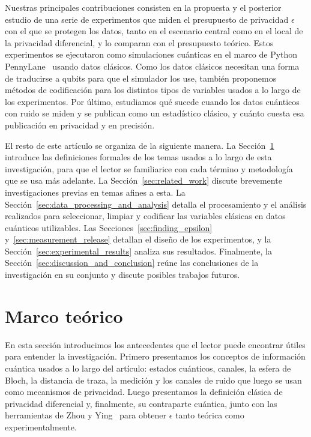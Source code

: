 \documentclass{ieeeaccess}
\begin{document}
Nuestras principales contribuciones consisten en la propuesta y el posterior estudio de una serie de experimentos que miden el presupuesto de privacidad $\epsilon$ con el que se protegen los datos, tanto en el escenario central como en el local de la privacidad diferencial, y lo comparan con el presupuesto teórico. Estos experimentos se ejecutaron como simulaciones cuánticas en el marco de Python PennyLane~\cite{bergholm2018pennylane} usando datos clásicos. Como los datos clásicos necesitan una forma de traducirse a qubits para que el simulador los use, también proponemos métodos de codificación para los distintos tipos de variables usados a lo largo de los experimentos. Por último, estudiamos qué sucede cuando los datos cuánticos con ruido se miden y se publican como un estadístico clásico, y cuánto cuesta esa publicación en privacidad y en precisión.

El resto de este artículo se organiza de la siguiente manera. La Sección~\ref{sec:background} introduce las definiciones formales de los temas usados a lo largo de esta investigación, para que el lector se familiarice con cada término y metodología que se usa más adelante. La Sección~\ref{sec:related_work} discute brevemente investigaciones previas en temas afines a esta. La Sección~\ref{sec:data_processing_and_analysis} detalla el procesamiento y el análisis realizados para seleccionar, limpiar y codificar las variables clásicas en datos cuánticos utilizables. Las Secciones~\ref{sec:finding_epsilon} y~\ref{sec:measurement_release} detallan el diseño de los experimentos, y la Sección~\ref{sec:experimental_results} analiza sus resultados. Finalmente, la Sección~\ref{sec:discussion_and_conclusion} reúne las conclusiones de la investigación en su conjunto y discute posibles trabajos futuros.

\section{Marco teórico}
\label{sec:background}

En esta sección introducimos los antecedentes que el lector puede encontrar útiles para entender la investigación. Primero presentamos los conceptos de información cuántica usados a lo largo del artículo: estados cuánticos, canales, la esfera de Bloch, la distancia de traza, la medición y los canales de ruido que luego se usan como mecanismos de privacidad. Luego presentamos la definición clásica de privacidad diferencial y, finalmente, su contraparte cuántica, junto con las herramientas de Zhou y Ying~\cite{zhou2017differential} para obtener $\epsilon$ tanto teórica como experimentalmente.
\end{document}
